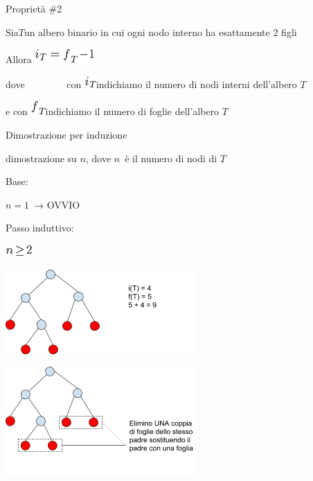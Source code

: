 \documentclass{article}
\begin{document}
{}

{}

{Proprietà \#2}

{}

{Sia}$T${un albero binario in cui ogni
nodo interno ha esattamente 2 figli}

{Allora }\includegraphics{images/image38.png}

{dove ~~~~~~~~con }\includegraphics{images/image39.png}{indichiamo il
numero di nodi interni dell'albero }$T$

{e con }\includegraphics{images/image40.png}{indichiamo il numero di
foglie dell'albero }$T$

{}

{}

{Dimostrazione per induzione}

{dimostrazione su }$n${, dove
}$n${~è il numero di nodi di
}$T$

{}

{Base:}

$n=1${~→ OVVIO}

{}

{Passo induttivo:}

\includegraphics{images/image43.png}

{\includegraphics{images/image525.png}}

{\includegraphics{images/image536.png}}
\end{document}
